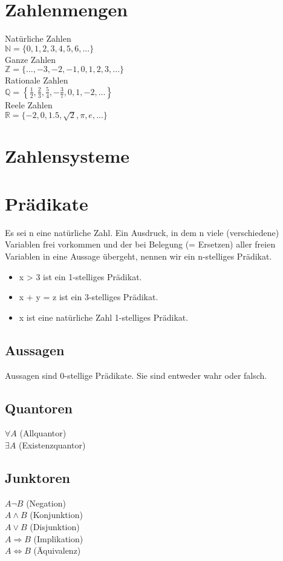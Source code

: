 \section{Zahlenmengen}
Natürliche Zahlen\\
\(\mathbb{N} = \{0,1,2,3,4,5,6,...\}\) \\
Ganze Zahlen\\
\(\mathbb{Z} = \{...,-3,-2,-1,0,1,2,3,...\}\) \\
Rationale Zahlen\\
\(\mathbb{Q} = \left\{ \frac{1}{2}, \frac{2}{3}, \frac{5}{4}, -\frac{3}{7}, 0, 1, -2, ... \right\}\) \\
Reele Zahlen\\
\(\mathbb{R} = \{ -2, 0, 1.5, \sqrt{2}, \pi, e, ... \}\)

\section{Zahlensysteme}

\section{Prädikate}
Es sei n eine natürliche Zahl. Ein Ausdruck, in dem n viele
(verschiedene) Variablen frei vorkommen und der bei Belegung (=
Ersetzen) aller freien Variablen in eine Aussage übergeht, nennen wir
ein n-stelliges Prädikat.
\begin{itemize}
    \item x > 3 ist ein 1-stelliges Prädikat.
    \item x + y = z ist ein 3-stelliges Prädikat.
    \item x ist eine natürliche Zahl 1-stelliges Prädikat.
\end{itemize}
\subsection{Aussagen}
Aussagen sind 0-stellige Prädikate. Sie sind entweder wahr oder falsch.
\subsection{Quantoren}
\(\forall A\) (Allquantor)\\
\(\exists A\) (Existenzquantor)
\subsection{Junktoren}
\(A \neg B\) (Negation)\\
\(A \wedge B\) (Konjunktion)\\
\(A \vee B\) (Disjunktion)\\
\(A \Rightarrow B\) (Implikation)\\
\(A \Leftrightarrow B\) (Äquivalenz)

